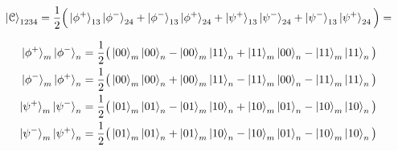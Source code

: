 \documentclass[a4paper,11pt]{article}
\begin{document}
\begin{align*}
\ket{\mathcal{C}}_{1234} = \dfrac{1}{2} \Big(\ket{\phi^+}_{13} \ket{\phi^-}_{24} + 
\ket{\phi^-}_{13} \ket{\phi^+}_{24} +
\ket{\psi^+}_{13} \ket{\psi^-}_{24} +
\ket{\psi^-}_{13} \ket{\psi^+}_{24} \Big) = \nonumber \\
\end{align*}

\begin{align*}
\ket{\phi^+}_{m} \ket{\phi^-}_{n} = \dfrac{1}{2} \big(\ket{00}_m \ket{00}_n - \ket{00}_m \ket{11}_n + \ket{11}_m \ket{00}_n - \ket{11}_m \ket{11}_n \big) \nonumber \\
\ket{\phi^-}_{m} \ket{\phi^+}_{n} = \dfrac{1}{2} \big(\ket{00}_m \ket{00}_n + \ket{00}_m \ket{11}_n - \ket{11}_m \ket{00}_n - \ket{11}_m \ket{11}_n \big) \nonumber \\
\ket{\psi^+}_{m} \ket{\psi^-}_{n} = \dfrac{1}{2} \big(\ket{01}_m \ket{01}_n - \ket{01}_m \ket{10}_n + \ket{10}_m \ket{01}_n - \ket{10}_m \ket{10}_n \big)
\nonumber \\
\ket{\psi^-}_{m} \ket{\psi^+}_{n} = \dfrac{1}{2} \big(\ket{01}_m \ket{01}_n + \ket{01}_m \ket{10}_n - \ket{10}_m \ket{01}_n - \ket{10}_m \ket{10}_n \big)
\end{align*}


\end{document}
